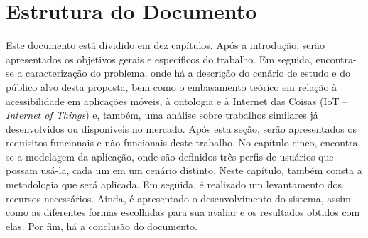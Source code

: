 \section{Estrutura do Documento}
Este documento está dividido em dez capítulos. Após a introdução, serão apresentados os objetivos gerais e específicos do trabalho. Em seguida, encontra-se a caracterização do problema, onde há a descrição do cenário de estudo e do público alvo desta proposta, bem como o embasamento teórico em relação à acessibilidade em aplicações móveis, à ontologia e à Internet das Coisas (IoT -- \emph{Internet of Things}) e, também, uma análise sobre trabalhos similares já desenvolvidos ou disponíveis no mercado. Após esta seção, serão apresentados os requisitos funcionais e não-funcionais deste trabalho. No capítulo cinco, encontra-se a modelagem da aplicação, onde são definidos três perfis de usuários que possam usá-la, cada um em um cenário distinto. Neste capítulo, também consta a metodologia que será aplicada. Em seguida, é realizado um levantamento dos recursos necessários. Ainda, é apresentado o desenvolvimento do sistema, assim como as diferentes formas escolhidas para sua avaliar e os resultados obtidos com elas. Por fim, há a conclusão do documento.